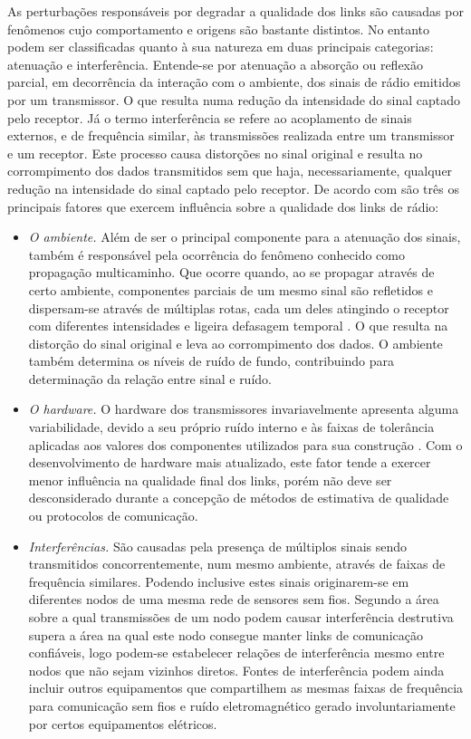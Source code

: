 \documentclass[
	12pt,				%
	openright,			%
	oneside,
	a4paper,			%
	english,			%
	french,				%
	spanish,			%
	brazil				%
	]{abntex2}
\begin{document}
As perturbações responsáveis por degradar a qualidade dos links são causadas por fenômenos cujo comportamento e origens são bastante distintos. No entanto podem ser classificadas quanto à sua natureza em duas principais categorias: atenuação e interferência. Entende-se por atenuação a absorção ou reflexão parcial, em decorrência da interação com o ambiente, dos sinais de rádio emitidos por um transmissor. O que resulta numa redução da intensidade do sinal captado pelo receptor. Já o termo interferência se refere ao acoplamento de sinais externos, e de frequência similar, às transmissões realizada entre um transmissor e um receptor. Este processo causa distorções no sinal original e resulta no corrompimento dos dados transmitidos sem que haja, necessariamente, qualquer redução na intensidade do sinal captado pelo receptor. De acordo com \cite{Baccour2012} são três os principais fatores que exercem influência sobre a qualidade dos links de rádio:
\begin{itemize}
	\item \textit{O ambiente.} Além de ser o principal componente para a atenuação dos sinais, também é responsável pela ocorrência do fenômeno conhecido como propagação multicaminho. Que ocorre quando, ao se propagar através de certo ambiente, componentes parciais de um mesmo sinal são refletidos e dispersam-se através de múltiplas rotas, cada um deles atingindo o receptor com diferentes intensidades e ligeira defasagem temporal \cite{Kusy2011}. O que resulta na distorção do sinal original e leva ao corrompimento dos dados. O ambiente também determina os níveis de ruído de fundo, contribuindo para determinação da relação entre sinal e ruído.
	\item \textit{O hardware.} O hardware dos transmissores invariavelmente apresenta alguma variabilidade, devido a seu próprio ruído interno e às faixas de tolerância aplicadas aos valores dos componentes utilizados para sua construção \cite{Goldsmith2005}. Com o desenvolvimento de hardware mais atualizado, este fator tende a exercer menor influência na qualidade final dos links, porém não deve ser desconsiderado durante a concepção de métodos de estimativa de qualidade ou protocolos de comunicação. 
	\item \textit{Interferências.} São causadas pela presença de múltiplos sinais sendo transmitidos concorrentemente, num mesmo ambiente, através de faixas de frequência similares. Podendo inclusive estes sinais originarem-se em diferentes nodos de uma mesma rede de sensores sem fios. Segundo \cite{Baccour2012} a área sobre a qual transmissões de um nodo podem causar interferência destrutiva supera a área na qual este nodo consegue manter links de comunicação confiáveis, logo podem-se estabelecer relações de interferência mesmo entre nodos que não sejam vizinhos diretos. Fontes de interferência podem ainda incluir outros equipamentos que compartilhem as mesmas faixas de frequência para comunicação sem fios e ruído eletromagnético gerado involuntariamente por certos equipamentos elétricos.
\end{itemize}
\end{document}

